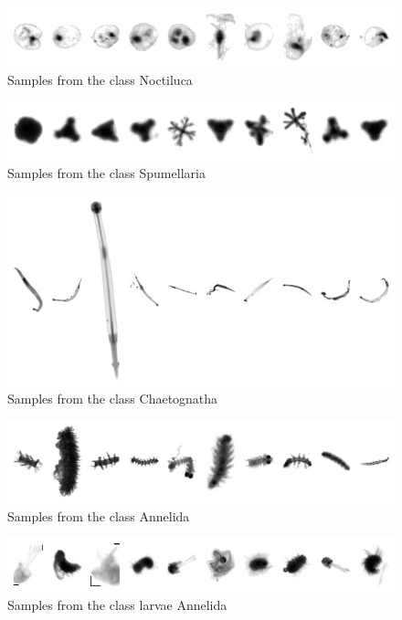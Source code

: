 \begin{figure}[h]
\includegraphics[width=\columnwidth]{collage/039_Noctiluca.jpg}\caption{Samples from the class Noctiluca }
\end{figure}
\begin{figure}[h]
\includegraphics[width=\columnwidth]{collage/040_Spumellaria.jpg}\caption{Samples from the class Spumellaria }
\end{figure}
\begin{figure}[h]
\includegraphics[width=\columnwidth]{collage/041_Chaetognatha.jpg}\caption{Samples from the class Chaetognatha }
\end{figure}
\begin{figure}[h]
\includegraphics[width=\columnwidth]{collage/042_Annelida.jpg}\caption{Samples from the class Annelida }
\end{figure}
\begin{figure}[h]
\includegraphics[width=\columnwidth]{collage/043_larvae__Annelida.jpg}\caption{Samples from the class larvae  Annelida }
\end{figure}
